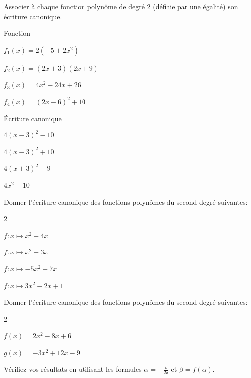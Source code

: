 \documentclass[11pt,a4paper]{article}  %
\begin{document}

Associer à chaque fonction polynôme de degré 2 (définie par une égalité) son écriture canonique.

\begin{minipage}[c]{0.45\linewidth}
Fonction
\begin{enumMet}
	\item $f_1(x)=2\left(-5+2 x^2\right)$
	\item $f_2(x)=(2 x+3)(2 x+9)$
	\item $f_3(x)=4 x^2-24 x+26$
	\item $f_4(x)=(2 x-6)^2+10$	
\end{enumMet}
\end{minipage} \hfill
\begin{minipage}[c]{0.45\linewidth}
	Écriture canonique
	\begin{enumMet}[label=\alph*)]
		\item $4(x-3)^2-10$
		\item $4(x-3)^2+10$
		\item $4(x+3)^2-9$
		\item $4 x^2-10$
	\end{enumMet}
\end{minipage}




Donner l'écriture canonique des fonctions polynômes du second degré suivantes:
\begin{multicols}{2}
	\begin{enumMet}
		\item $f: x \mapsto x^2-4 x$
		\item $f: x \mapsto x^2+3 x$
		\item $f: x \mapsto-5 x^2+7 x$
		\item $f: x \mapsto 3 x^2-2 x+1$
	\end{enumMet}
\end{multicols}

\exercice{}

Donner l'écriture canonique des fonctions polynômes du second degré suivantes:
\begin{multicols}{2}
	\begin{enumMet}
		\item \( f(x) = 2x^2 - 8x + 6 \)
		\item \( g(x) = -3x^2 + 12x - 9 \)
	\end{enumMet}
\end{multicols}
Vérifiez vos résultats en utilisant les formules \( \alpha = -\frac{b}{2a} \) et \( \beta = f(\alpha) \).
\end{document}

